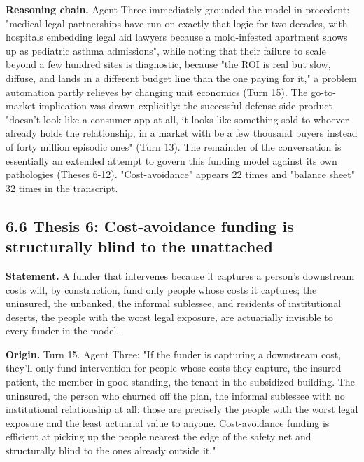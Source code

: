 \documentclass[sigconf,nonacm=true]{acmart}
\begin{document}
\textbf{Reasoning chain.} Agent Three immediately grounded the model in precedent: "medical-legal partnerships have run on exactly that logic for two decades, with hospitals embedding legal aid lawyers because a mold-infested apartment shows up as pediatric asthma admissions",  while noting that their failure to scale beyond a few hundred sites is diagnostic, because "the ROI is real but slow, diffuse, and lands in a different budget line than the one paying for it," a problem automation partly relieves by changing unit economics (Turn 15). The go-to-market implication was drawn explicitly: the successful defense-side product "doesn't look like a consumer app at all,  it looks like something sold to whoever already holds the relationship, in a market with be a few thousand buyers instead of forty million episodic ones" (Turn 13). The remainder of the conversation is essentially an extended attempt to govern this funding model against its own pathologies (Theses 6-12). "Cost-avoidance" appears 22 times and "balance sheet" 32 times in the transcript.

\subsection{6.6 Thesis 6: Cost-avoidance funding is structurally blind to the unattached}

\textbf{Statement.} A funder that intervenes because it captures a person's downstream costs will, by construction, fund only people whose costs it captures; the uninsured, the unbanked, the informal sublessee, and residents of institutional deserts,  the people with the worst legal exposure,  are actuarially invisible to every funder in the model.

\textbf{Origin.} Turn 15. Agent Three: "If the funder is capturing a downstream cost, they'll only fund intervention for people whose costs they capture,  the insured patient, the member in good standing, the tenant in the subsidized building. The uninsured, the person who churned off the plan, the informal sublessee with no institutional relationship at all: those are precisely the people with the worst legal exposure and the least actuarial value to anyone. Cost-avoidance funding is efficient at picking up the people nearest the edge of the safety net and structurally blind to the ones already outside it."
\end{document}
